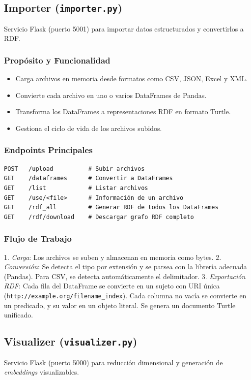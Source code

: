 \documentclass{article}
\begin{document}
\subsection{Importer (\texttt{importer.py})}
Servicio Flask (puerto 5001) para importar datos estructurados y convertirlos a RDF.

\subsubsection{Propósito y Funcionalidad}
\begin{itemize}
    \item Carga archivos en memoria desde formatos como CSV, JSON, Excel y XML.
    \item Convierte cada archivo en uno o varios DataFrames de Pandas.
    \item Transforma los DataFrames a representaciones RDF en formato Turtle.
    \item Gestiona el ciclo de vida de los archivos subidos.
\end{itemize}

\subsubsection{Endpoints Principales}
\begin{verbatim}
POST   /upload          # Subir archivos
GET    /dataframes      # Convertir a DataFrames
GET    /list            # Listar archivos
GET    /use/<file>      # Información de un archivo
GET    /rdf_all         # Generar RDF de todos los DataFrames
GET    /rdf/download    # Descargar grafo RDF completo
\end{verbatim}

\subsubsection{Flujo de Trabajo}
1. \textit{Carga}: Los archivos se suben y almacenan en memoria como bytes.
2. \textit{Conversión}: Se detecta el tipo por extensión y se parsea con la librería adecuada (Pandas). Para CSV, se detecta automáticamente el delimitador.
3. \textit{Exportación RDF}: Cada fila del DataFrame se convierte en un sujeto con URI única (\texttt{http://example.org/filename\_index}). Cada columna no vacía se convierte en un predicado, y su valor en un objeto literal. Se genera un documento Turtle unificado.

\subsection{Visualizer (\texttt{visualizer.py})}
Servicio Flask (puerto 5000) para reducción dimensional y generación de \textit{embeddings} visualizables.
\end{document}
